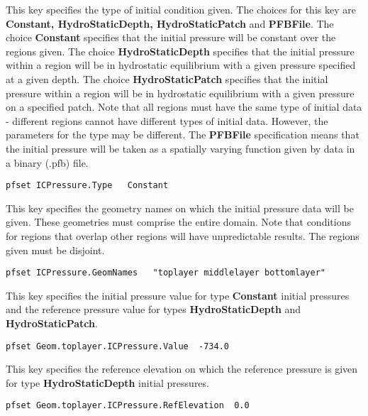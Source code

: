 {This key specifies the type of initial condition given.  The choices for this
key are {\bf Constant, HydroStaticDepth, HydroStaticPatch} and {\bf PFBFile}.
The choice {\bf Constant} specifies that the initial pressure will be constant
over the regions given.  The choice {\bf HydroStaticDepth} specifies that the
initial pressure within a region 
will be in hydrostatic equilibrium with a given pressure
specified at a given depth.  The choice {\bf HydroStaticPatch} specifies that
the initial pressure within a region 
will be in hydrostatic equilibrium with a given pressure on a specified patch.
Note that all regions must have the same type of initial data - different
regions cannot have different types of initial data.  However, the parameters
for the type may be different.
The {\bf PFBFile} specification means that the initial pressure 
will be taken as a spatially varying function given by data in a
\parflow{} binary (.pfb) file.  
}
\begin{display}\begin{verbatim}
pfset ICPressure.Type   Constant
\end{verbatim}\end{display}

{This key specifies the geometry names on which the initial pressure data will
be given.  These geometries must comprise the entire domain.
Note that conditions for regions that overlap other regions will have
unpredictable results.  The regions given must be disjoint.
}
\begin{display}\begin{verbatim}
pfset ICPressure.GeomNames   "toplayer middlelayer bottomlayer"
\end{verbatim}\end{display}

{This key specifies the initial pressure value for type {\bf Constant} initial
pressures and the reference pressure value for types {\bf HydroStaticDepth} and
{\bf HydroStaticPatch}.
}
\begin{display}\begin{verbatim}
pfset Geom.toplayer.ICPressure.Value  -734.0
\end{verbatim}\end{display}

{This key specifies the reference elevation on which the reference pressure is
given for type {\bf HydroStaticDepth} initial pressures.
}
\begin{display}\begin{verbatim}
pfset Geom.toplayer.ICPressure.RefElevation  0.0
\end{verbatim}\end{display}

